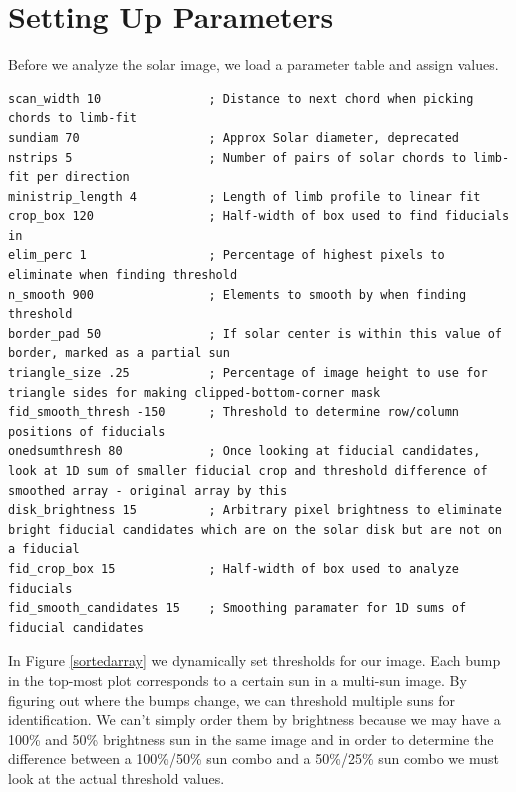 \documentclass[10pt]{scrartcl}
\begin{document}

\section{Setting Up Parameters} %
\label{sec:setting_up_parameters}
Before we analyze the solar image, we load a parameter table and assign values. 

\begin{lstlisting}
scan_width 10               ; Distance to next chord when picking chords to limb-fit
sundiam 70                  ; Approx Solar diameter, deprecated
nstrips 5                   ; Number of pairs of solar chords to limb-fit per direction
ministrip_length 4          ; Length of limb profile to linear fit
crop_box 120                ; Half-width of box used to find fiducials in
elim_perc 1                 ; Percentage of highest pixels to eliminate when finding threshold
n_smooth 900                ; Elements to smooth by when finding threshold 
border_pad 50               ; If solar center is within this value of border, marked as a partial sun
triangle_size .25           ; Percentage of image height to use for triangle sides for making clipped-bottom-corner mask
fid_smooth_thresh -150      ; Threshold to determine row/column positions of fiducials
onedsumthresh 80            ; Once looking at fiducial candidates, look at 1D sum of smaller fiducial crop and threshold difference of smoothed array - original array by this
disk_brightness 15          ; Arbitrary pixel brightness to eliminate bright fiducial candidates which are on the solar disk but are not on a fiducial
fid_crop_box 15             ; Half-width of box used to analyze fiducials
fid_smooth_candidates 15    ; Smoothing paramater for 1D sums of fiducial candidates 
\end{lstlisting}

In Figure \ref{sortedarray} we dynamically set thresholds for our image. Each bump in the top-most plot corresponds to a certain sun in a multi-sun image. By figuring out where the bumps change, we can threshold multiple suns for identification. We can't simply order them by brightness because we may have a 100\% and 50\% brightness sun in the same image and in order to determine the difference between a 100\%/50\% sun combo and a 50\%/25\% sun combo we must look at the actual threshold values.
\end{document}
